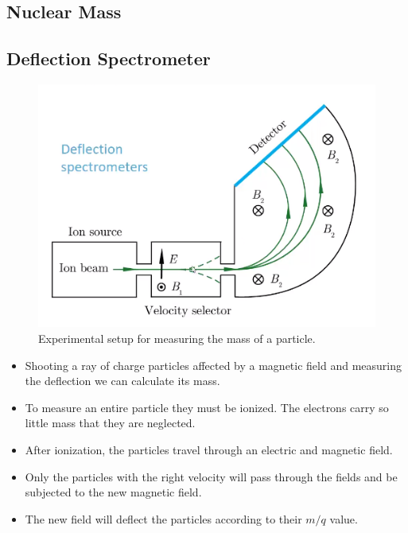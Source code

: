 \subsection{Nuclear Mass}
\subsection{Deflection Spectrometer}
\begin{figure}[ht!]
\centering
\includegraphics[width = .5\textwidth]{deflection_spectrometer.png}
\caption{Experimental setup for measuring the mass of a particle.}
\label{fig: deflection_spectrometer}
\end{figure}

\begin{itemize}
    \item Shooting a ray of charge particles affected by a magnetic field and measuring the deflection we can calculate its mass. 
    \item To measure an entire particle they must be ionized. The electrons carry so little mass that they are neglected.
    \item After ionization, the particles travel through an electric and magnetic field. 
    \item Only the particles with the right velocity will pass through the fields and be subjected to the new magnetic field. 
    \item The new field will deflect the particles according to their $m / q$ value. 
\end{itemize}
